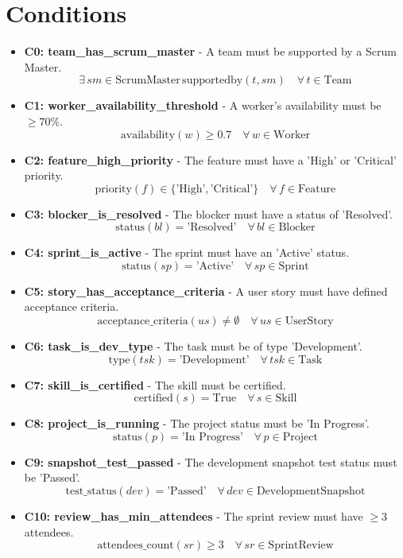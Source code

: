 \documentclass[11pt]{article}
\begin{document}
\section{Conditions}
\begin{itemize}
    \item \textbf{C0: team\_has\_scrum\_master} - A team must be supported by a Scrum Master.
        \[ \exists \, sm \in \text{ScrumMaster} \, \text{supportedby}(t, sm) \quad \forall \, t \in \text{Team} \]
    \item \textbf{C1: worker\_availability\_threshold} - A worker's availability must be $\geq 70\%$.
        \[ \text{availability}(w) \geq 0.7 \quad \forall \, w \in \text{Worker} \]
    \item \textbf{C2: feature\_high\_priority} - The feature must have a 'High' or 'Critical' priority.
        \[ \text{priority}(f) \in \{\text{'High'}, \text{'Critical'}\} \quad \forall \, f \in \text{Feature} \]
    \item \textbf{C3: blocker\_is\_resolved} - The blocker must have a status of 'Resolved'.
        \[ \text{status}(bl) = \text{'Resolved'} \quad \forall \, bl \in \text{Blocker} \]
    \item \textbf{C4: sprint\_is\_active} - The sprint must have an 'Active' status.
        \[ \text{status}(sp) = \text{'Active'} \quad \forall \, sp \in \text{Sprint} \]
    \item \textbf{C5: story\_has\_acceptance\_criteria} - A user story must have defined acceptance criteria.
        \[ \text{acceptance\_criteria}(us) \neq \emptyset \quad \forall \, us \in \text{UserStory} \]
    \item \textbf{C6: task\_is\_dev\_type} - The task must be of type 'Development'.
        \[ \text{type}(tsk) = \text{'Development'} \quad \forall \, tsk \in \text{Task} \]
    \item \textbf{C7: skill\_is\_certified} - The skill must be certified.
        \[ \text{certified}(s) = \text{True} \quad \forall \, s \in \text{Skill} \]
    \item \textbf{C8: project\_is\_running} - The project status must be 'In Progress'.
        \[ \text{status}(p) = \text{'In Progress'} \quad \forall \, p \in \text{Project} \]
    \item \textbf{C9: snapshot\_test\_passed} - The development snapshot test status must be 'Passed'.
        \[ \text{test\_status}(dev) = \text{'Passed'} \quad \forall \, dev \in \text{DevelopmentSnapshot} \]
    \item \textbf{C10: review\_has\_min\_attendees} - The sprint review must have $\geq 3$ attendees.
        \[ \text{attendees\_count}(sr) \geq 3 \quad \forall \, sr \in \text{SprintReview} \]
\end{itemize}
\end{document}
